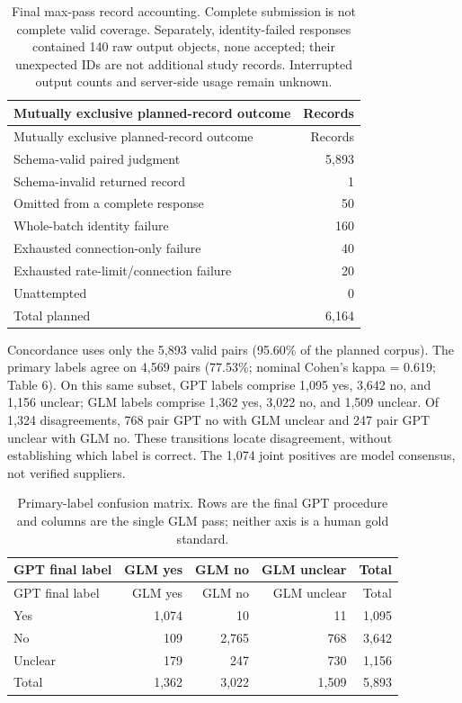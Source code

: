 \documentclass[10pt]{article}
\begin{document}
\begin{longtable}[]{@{}lr@{}}
\caption{Final max-pass record accounting. Complete submission is not complete valid coverage. Separately, identity-failed responses contained 140 raw output objects, none accepted; their unexpected IDs are not additional study records. Interrupted output counts and server-side usage remain unknown.}\tabularnewline
\toprule\noalign{}
Mutually exclusive planned-record outcome & Records \\
\midrule\noalign{}
\endfirsthead
\toprule\noalign{}
Mutually exclusive planned-record outcome & Records \\
\midrule\noalign{}
\endhead
\bottomrule\noalign{}
\endlastfoot
Schema-valid paired judgment & 5,893 \\
Schema-invalid returned record & 1 \\
Omitted from a complete response & 50 \\
Whole-batch identity failure & 160 \\
Exhausted connection-only failure & 40 \\
Exhausted rate-limit/connection failure & 20 \\
Unattempted & 0 \\
Total planned & 6,164 \\
\end{longtable}

Concordance uses only the 5,893 valid pairs (95.60\% of the planned corpus). The primary labels agree on 4,569 pairs (77.53\%; nominal Cohen's kappa = 0.619; Table 6). On this same subset, GPT labels comprise 1,095 yes, 3,642 no, and 1,156 unclear; GLM labels comprise 1,362 yes, 3,022 no, and 1,509 unclear. Of 1,324 disagreements, 768 pair GPT no with GLM unclear and 247 pair GPT unclear with GLM no. These transitions locate disagreement, without establishing which label is correct. The 1,074 joint positives are model consensus, not verified suppliers.

\begin{longtable}[]{@{}lrrrr@{}}
\caption{Primary-label confusion matrix. Rows are the final GPT procedure and columns are the single GLM pass; neither axis is a human gold standard.}\tabularnewline
\toprule\noalign{}
GPT final label & GLM yes & GLM no & GLM unclear & Total \\
\midrule\noalign{}
\endfirsthead
\toprule\noalign{}
GPT final label & GLM yes & GLM no & GLM unclear & Total \\
\midrule\noalign{}
\endhead
\bottomrule\noalign{}
\endlastfoot
Yes & 1,074 & 10 & 11 & 1,095 \\
No & 109 & 2,765 & 768 & 3,642 \\
Unclear & 179 & 247 & 730 & 1,156 \\
Total & 1,362 & 3,022 & 1,509 & 5,893 \\
\end{longtable}
\end{document}
